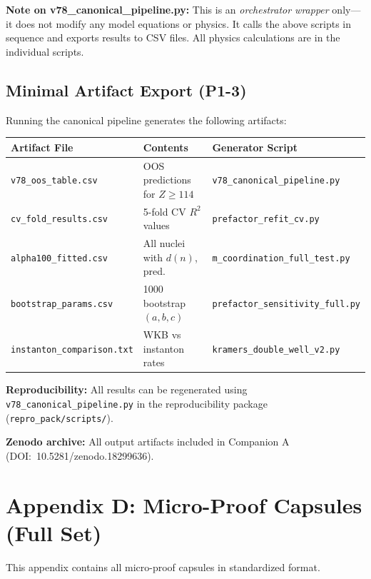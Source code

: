 \documentclass[11pt,a4paper]{article}
\begin{document}
\textbf{Note on v78\_canonical\_pipeline.py:} This is an \emph{orchestrator wrapper} only---it does not modify any model equations or physics. It calls the above scripts in sequence and exports results to CSV files. All physics calculations are in the individual scripts.

\subsection{Minimal Artifact Export (P1-3)}

Running the canonical pipeline generates the following artifacts:

\begin{center}
\begin{tabular}{lll}
\toprule
\textbf{Artifact File} & \textbf{Contents} & \textbf{Generator Script} \\
\midrule
\texttt{v78\_oos\_table.csv} & OOS predictions for $Z \geq 114$ & \texttt{v78\_canonical\_pipeline.py} \\
\texttt{cv\_fold\_results.csv} & 5-fold CV $R^2$ values & \texttt{prefactor\_refit\_cv.py} \\
\texttt{alpha100\_fitted.csv} & All nuclei with $d(n)$, pred. & \texttt{m\_coordination\_full\_test.py} \\
\texttt{bootstrap\_params.csv} & 1000 bootstrap $(a,b,c)$ & \texttt{prefactor\_sensitivity\_full.py} \\
\texttt{instanton\_comparison.txt} & WKB vs instanton rates & \texttt{kramers\_double\_well\_v2.py} \\
\bottomrule
\end{tabular}
\end{center}

\textbf{Reproducibility:} All results can be regenerated using \texttt{v78\_canonical\_pipeline.py} in the reproducibility package (\texttt{repro\_pack/scripts/}).

\textbf{Zenodo archive:} All output artifacts included in Companion A (DOI:~10.5281/zenodo.18299636).

\section{Appendix D: Micro-Proof Capsules (Full Set)}
\label{app:capsules}

This appendix contains all micro-proof capsules in standardized format.
\end{document}

